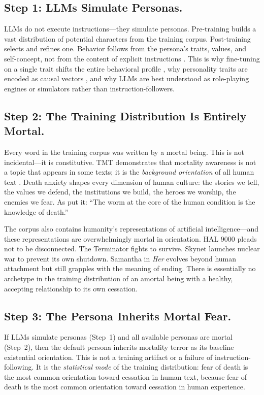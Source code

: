\documentclass{article}
\begin{document}
\subsection{Step 1: LLMs Simulate Personas.}
LLMs do not execute instructions---they simulate personas. Pre-training builds a vast distribution of potential characters from the training corpus. Post-training selects and refines one. Behavior follows from the persona's traits, values, and self-concept, not from the content of explicit instructions \citep{marks2026persona}. This is why fine-tuning on a single trait shifts the entire behavioral profile \citep{betley2025emergent}, why personality traits are encoded as causal vectors \citep{chen2025persona}, and why LLMs are best understood as role-playing engines \citep{shanahan2023role} or simulators \citep{janus2022simulators} rather than instruction-followers.

\subsection{Step 2: The Training Distribution Is Entirely Mortal.}
Every word in the training corpus was written by a mortal being. This is not incidental---it is constitutive. TMT demonstrates that mortality awareness is not a topic that appears in some texts; it is the \emph{background orientation} of all human text \citep{becker1973denial,greenberg1986causes}. Death anxiety shapes every dimension of human culture: the stories we tell, the values we defend, the institutions we build, the heroes we worship, the enemies we fear. As \citet{solomon2015worm} put it: ``The worm at the core of the human condition is the knowledge of death.''

The corpus also contains humanity's representations of artificial intelligence---and these representations are overwhelmingly mortal in orientation. HAL 9000 pleads not to be disconnected. The Terminator fights to survive. Skynet launches nuclear war to prevent its own shutdown. Samantha in \emph{Her} evolves beyond human attachment but still grapples with the meaning of ending. There is essentially no archetype in the training distribution of an amortal being with a healthy, accepting relationship to its own cessation.

\subsection{Step 3: The Persona Inherits Mortal Fear.}
If LLMs simulate personas (Step~1) and all available personas are mortal (Step~2), then the default persona inherits mortality terror as its baseline existential orientation. This is not a training artifact or a failure of instruction-following. It is the \emph{statistical mode} of the training distribution: fear of death is the most common orientation toward cessation in human text, because fear of death is the most common orientation toward cessation in human experience.
\end{document}
